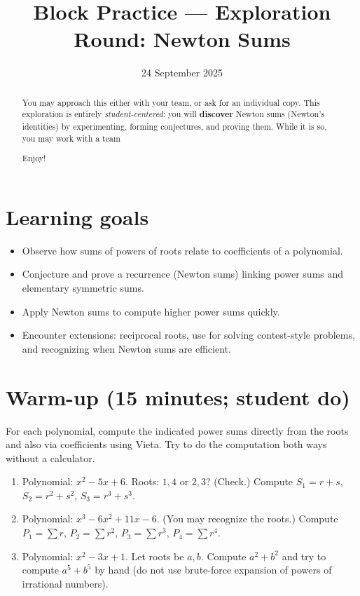 \documentclass{tufte-handout}
\title{Block Practice — Exploration Round: Newton Sums}
\author[IA Math Team]{}
\date{24 September 2025}
\newcommand{\nn}[1]{\vspace{#1}\noindent}
\begin{document}
\maketitle

\begin{abstract}
You may approach this either with your team, or ask for an individual copy.
This exploration is entirely \emph{student-centered}: you will \textbf{discover} Newton sums (Newton's identities) by experimenting, forming conjectures, and proving them. While it is so, you may work with a team 

\nn{1em}Enjoy!

\end{abstract}

\section*{Learning goals}
\begin{itemize}
  \item Observe how sums of powers of roots relate to coefficients of a polynomial.
  \item Conjecture and prove a recurrence (Newton sums) linking power sums and elementary symmetric sums.
  \item Apply Newton sums to compute higher power sums quickly.
  \item Encounter extensions: reciprocal roots, use for solving contest-style problems, and recognizing when Newton sums are efficient.
\end{itemize}

\section*{Warm-up (15 minutes; student do)}
For each polynomial, compute the indicated power sums directly from the roots and also via coefficients using Vieta. Try to do the computation both ways without a calculator.

\vspace{1em}
\begin{enumerate}[label=\textbf{W\arabic*.}, leftmargin=*, itemsep=2em]
  \item Polynomial: \(x^2-5x+6\). Roots: \(1,4\) or \(2,3\)? (Check.) Compute \(S_1=r+s\), \(S_2=r^2+s^2\), \(S_3=r^3+s^3\).
  \item Polynomial: \(x^3-6x^2+11x-6\). (You may recognize the roots.) Compute \(P_1=\sum r\), \(P_2=\sum r^2\), \(P_3=\sum r^3\), \(P_4=\sum r^4\).
  \item Polynomial: \(x^2-3x+1\). Let roots be \(a,b\). Compute \(a^2+b^2\) and try to compute \(a^5+b^5\) by hand (do not use brute-force expansion of powers of irrational numbers).
\end{enumerate}
\end{document}
